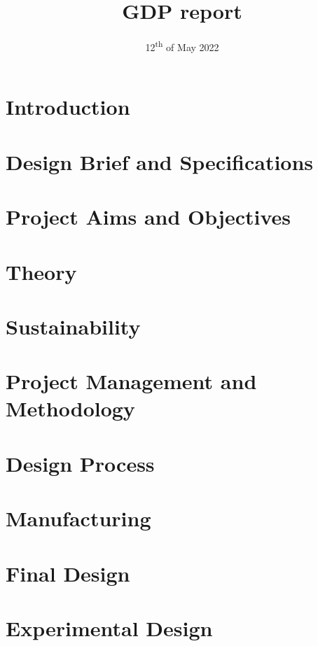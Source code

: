 \documentclass{article}
\title{GDP report}
\date{12\textsuperscript{th} of May 2022}
\begin{document}



\tableofcontents
\newpage

\section{Introduction}


\section{Design Brief and Specifications}


\section{Project Aims and Objectives}


\section{Theory}


\section{Sustainability}


\section{Project Management and Methodology}


\section{Design Process}


\section{Manufacturing}


\section{Final Design}


\section{Experimental Design}
\end{document}
